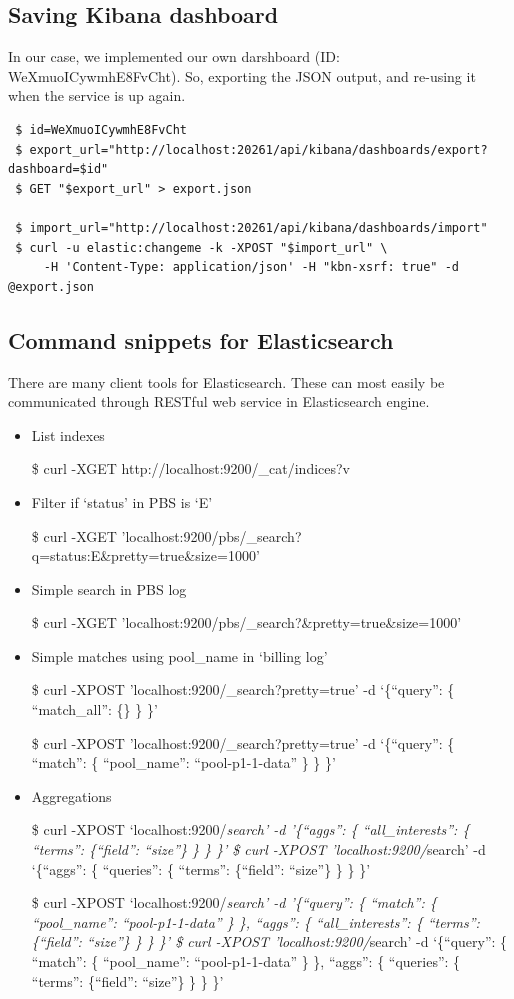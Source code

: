 \documentclass[]{article}
\begin{document}
\subsection{Saving Kibana dashboard}\label{saving-kibana-dashboard}

In our case, we implemented our own darshboard (ID:
WeXmuoICywmhE8FvCht). So, exporting the JSON output, and re-using it
when the service is up again.

\begin{verbatim}
 $ id=WeXmuoICywmhE8FvCht
 $ export_url="http://localhost:20261/api/kibana/dashboards/export?dashboard=$id"
 $ GET "$export_url" > export.json

 $ import_url="http://localhost:20261/api/kibana/dashboards/import"
 $ curl -u elastic:changeme -k -XPOST "$import_url" \
     -H 'Content-Type: application/json' -H "kbn-xsrf: true" -d @export.json
\end{verbatim}

\subsection{Command snippets for
Elasticsearch}\label{command-snippets-for-elasticsearch}

There are many client tools for Elasticsearch. These can most easily be
communicated through RESTful web service in Elasticsearch engine.

\begin{itemize}
\item
  List indexes

  \$ curl -XGET http://localhost:9200/\_cat/indices?v
\item
  Filter if `status' in PBS is `E'

  \$ curl -XGET
  'localhost:9200/pbs/\_search?q=status:E\&pretty=true\&size=1000'
\item
  Simple search in PBS log

  \$ curl -XGET 'localhost:9200/pbs/\_search?\&pretty=true\&size=1000'
\item
  Simple matches using pool\_name in `billing log'

  \$ curl -XPOST 'localhost:9200/\_search?pretty=true' -d `\{``query'':
  \{ ``match\_all'': \{\} \} \}'

  \$ curl -XPOST 'localhost:9200/\_search?pretty=true' -d `\{``query'':
  \{ ``match'': \{ ``pool\_name'': ``pool-p1-1-data'' \} \} \}'
\item
  Aggregations

  \$ curl -XPOST `localhost:9200/\emph{search' -d '\{``aggs'': \{
  ``all\_interests'': \{ ``terms'': \{``field'': ``size''\} \} \} \}' \$
  curl -XPOST 'localhost:9200/}search' -d `\{``aggs'': \{ ``queries'':
  \{ ``terms'': \{``field'': ``size''\} \} \} \}'

  \$ curl -XPOST `localhost:9200/\emph{search' -d '\{``query'': \{
  ``match'': \{ ``pool\_name'': ``pool-p1-1-data'' \} \}, ``aggs'': \{
  ``all\_interests'': \{ ``terms'': \{``field'': ``size''\} \} \} \}' \$
  curl -XPOST 'localhost:9200/}search' -d `\{``query'': \{ ``match'': \{
  ``pool\_name'': ``pool-p1-1-data'' \} \}, ``aggs'': \{ ``queries'': \{
  ``terms'': \{``field'': ``size''\} \} \} \}'
\end{itemize}
\end{document}
